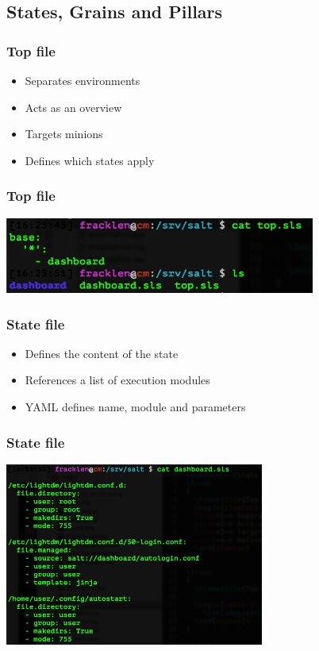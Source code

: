 \subsection{States, Grains and Pillars}
\frame
{
  \frametitle{Top file}
  \begin{itemize}
  \item<1-> Separates environments
  \item<2-> Acts as an overview
  \item<3-> Targets minions
  \item<4-> Defines which states apply
  \end{itemize}
}

\frame
{
  \frametitle{Top file}

  \begin{center}%
    \includegraphics[height=2.5cm]{images/salt_top.png}
  \end{center}%
}

\frame
{
  \frametitle{State file}
  \begin{itemize}
  \item<1-> Defines the content of the state
  \item<2-> References a list of execution modules
  \item<3-> YAML defines name, module and parameters
  \end{itemize}
}

\frame
{
  \frametitle{State file}

  \begin{center}%
    \includegraphics[height=6cm]{images/salt_state.png}
  \end{center}%
}

